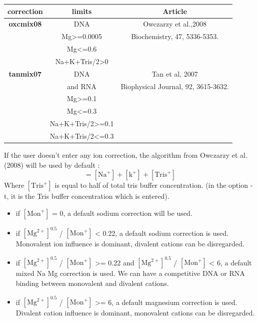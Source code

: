 \documentclass{article}
\begin{document}
\begin{table}[hc]
\begin{tabular}[h]{| c | c | c |}
\textbf{correction} & \textbf{limits} & \textbf{Article} \\
\hline 
\textbf{oxcmix08} & DNA & Owczarzy et al.,2008 \\
 & Mg>=0.0005 & Biochemistry, 47, 5336-5353. \\
 & Mg<=0.6 & \\
 & Na+K+Tris/2>0 & \\
 \hline
\textbf{tanmix07} & DNA & Tan et al, 2007 \\
 & and RNA & Biophysical Journal, 92, 3615-3632.\\
 & Mg>=0.1 & \\
 & Mg<=0.3 & \\
 & Na+K+Tris/2>=0.1 & \\
 & Na+K+Tris/2<=0.3 & \\
 \hline
\end{tabular}
\end{table}

If the user doesn't enter any ion correction, the algorithm from Owczarzy et al. (2008) will
be used by default :
\begin{displaymath}
 [\mbox{Mon}^+] = [\mbox{Na}^+] + [\mbox{k}^+] + [\mbox{Tris}^+]
\end{displaymath}
Where $[\mbox{Tris}^+]$ is equal to half of total tris buffer concentration. (in the option -t, it is the Tris buffer concentration
which is entered).

\begin{itemize}
\item if $[\mbox{Mon}^+]$ = 0, a default sodium correction will be used.
\item if $[\mbox{Mg}^{2+}]^0.5$ / $[\mbox{Mon}^+]$ < 0.22, a default sodium correction is used.
Monovalent ion influence is dominant, divalent cations can be 
disregarded.
\item if $[\mbox{Mg}^{2+}]^0.5$ / $[\mbox{Mon}^+]$ >= 0.22 and $[\mbox{Mg}^{2+}]^0.5$ / $[\mbox{Mon}^+]$ < 6, 
a default mixed Na Mg correction is used.
We can have a competitive DNA or RNA binding between monovalent and divalent 
cations.
\item if $[\mbox{Mg}^{2+}]^0.5$ / $[\mbox{Mon}^+]$ >= 6, a default magnesium correction is used.
Divalent cation influence is dominant, monovalent cations can be 
disregarded.
\end{itemize}
\end{document}
